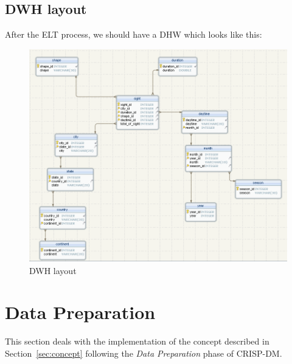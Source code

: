 \documentclass[11pt, journal]{IEEEtran}
\begin{document}
\subsection{DWH layout}\label{subsec:DWHLayout}
After the ELT process, we should have a DHW which looks like this:
\begin{figure}[htb]
	\centering
		\includegraphics[width=1.0\columnwidth]{images/CDWHUFO}
	\caption{DWH layout}
	\label{fig:CDWHlayout}
\end{figure}

 
\section{Data Preparation} \label{sec:dataPreparation}
This section deals with the implementation of the concept described in Section~\ref{sec:concept} following the \emph{Data Preparation}
phase of CRISP-DM. 
\end{document}
